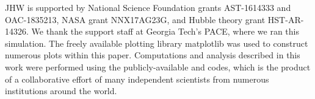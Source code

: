 \documentclass[a4paper,fleqn,usenatbib]{mnras}
\begin{document}
JHW is supported by National Science Foundation grants AST-1614333 and OAC-1835213, NASA grant NNX17AG23G, and Hubble theory grant
HST-AR-14326.  We thank the support staff at Georgia Tech's PACE,
where we ran this simulation.  The freely available plotting library
{\sc matplotlib} \citep{matplotlib} was used to construct numerous
plots within this paper. Computations and analysis described in this
work were performed using the publicly-available \enzo{} and \yt{}
codes, which is the product of a collaborative effort of many
independent scientists from numerous institutions around the world.










\appendix



\bsp	%
\label{lastpage}
\end{document}
